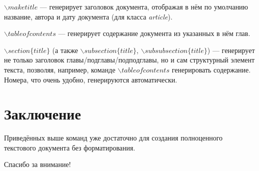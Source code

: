 \documentclass[12pt]{article}
\begin{document}
$\backslash maketitle$ --- генерирует заголовок документа, отображая в нём по умолчанию название, автора и дату документа (для класса \emph{article}).

$\backslash tableofcontents$ --- генерирует содержание документа из указанных в нём глав.

$\backslash section\{title\}$ (а также $\backslash subsection\{title\}$, $\backslash subsubsection\{title\}$) --- генерирует не только заголовок главы/подглавы/подподглавы, но и сам структурный элемент текста, позволяя, например, команде $\backslash tableofcontents$ генерировать содержание.
Номера, что очень удобно, генерируются автоматически.

\section{Заключение}

Приведённых выше команд уже достаточно для создания полноценного текстового документа без форматирования.

Спасибо за внимание!
\end{document}
